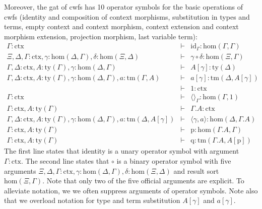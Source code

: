 \documentclass[11pt,a4paper]{article}
\theoremstyle{definition}
\newcommand{\id}{\mathsf{id}}
\def\Hom{\mathrm{hom}}
\def\id{\mathrm{id}}
\newcommand{\ctx}{\mathrm{ctx}}
\newcommand{\ty}{\mathrm{ty}}
\newcommand{\tm}{\mathrm{tm}}
\newcommand{\tuple}[1]{\langle #1 \rangle}
\newcommand{\cext}{.}
\def\p{\mathrm{p}}
\def\q{\mathrm{q}}
\begin{document}
Moreover, the gat of cwfs has 10 operator symbols for the basic operations of cwfs (identity and composition of context morphisms, substitution in types and terms, empty context and context morphism, context extension and context morphism extension, projection morphism, last variable term): 
\begin{eqnarray*}
\Gamma : \ctx &\vdash& \id_{\Gamma} : \Hom(\Gamma,\Gamma)\\
\Xi,\Delta,\Gamma : \ctx, \gamma : \Hom(\Delta,\Gamma), \delta : \Hom(\Xi,\Delta) &\vdash&
\gamma \circ \delta : \Hom(\Xi,\Gamma)\\
\Gamma,\Delta : \ctx, A:\ty(\Gamma), \gamma : \Hom(\Delta,\Gamma) &\vdash&
A[\gamma] : \ty(\Delta)\\
\Gamma,\Delta : \ctx, A:\ty(\Gamma), \gamma : \Hom(\Delta,\Gamma), a:\tm(\Gamma,A) &\vdash&  a[\gamma] : \tm(\Delta,A[\gamma])\\
&\vdash& 1 : \ctx\\
\Gamma : \ctx &\vdash& \tuple{}_\Gamma : \Hom(\Gamma,1)\\
\Gamma : \ctx, A:\ty(\Gamma) &\vdash& \Gamma\cext A : \ctx\\
\Gamma,\Delta : \ctx, A:\ty(\Gamma), \gamma : \Hom(\Delta,\Gamma), a:\tm(\Delta,A[\gamma]) &\vdash& \tuple{\gamma,a} : \Hom(\Delta,\Gamma\cext A)\\
\Gamma : \ctx, A:\ty(\Gamma) &\vdash& \p: \Hom(\Gamma\cext A,\Gamma)\\
\Gamma : \ctx, A:\ty(\Gamma) &\vdash& \q: \tm(\Gamma\cext A,A[\p])
\end{eqnarray*}
The first line states that identity is a unary operator symbol with argument $\Gamma : \ctx$. The second line states that $\circ$ is a binary operator symbol with five arguments $\Xi,\Delta,\Gamma : \ctx, \gamma : \Hom(\Delta,\Gamma), \delta : \Hom(\Xi,\Delta)$ and result sort $\Hom(\Xi,\Gamma)$. Note that only two of the five official arguments are explicit. To alleviate notation, we we often suppress arguments of operator symbols. Note also that we overload notation for type and term substitution $A[\gamma]$ and $a[\gamma]$.
\end{document}
